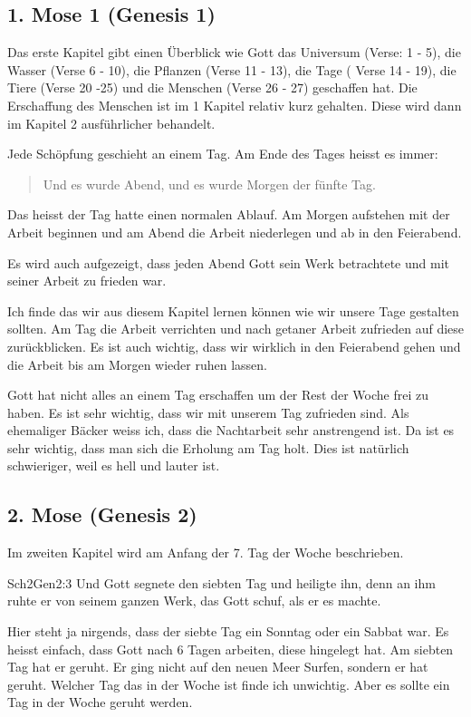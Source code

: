 
\subsection{1. Mose 1 (Genesis 1)}
Das erste Kapitel gibt einen Überblick wie Gott das Universum (Verse: 1 - 5), die Wasser (Verse 6 - 10), die Pflanzen (Verse 11 - 13), die Tage ( Verse 14 - 19), die Tiere (Verse 20 -25) und die Menschen (Verse 26 - 27) geschaffen hat. Die Erschaffung des Menschen ist im 1 Kapitel relativ kurz gehalten. Diese wird dann im Kapitel 2 ausführlicher behandelt.

Jede Schöpfung geschieht an einem Tag. Am Ende des Tages heisst es immer: \begin{quote}
    Und es wurde Abend, und es wurde Morgen der fünfte Tag.
\end{quote} Das heisst der Tag hatte einen normalen Ablauf. Am Morgen aufstehen mit der Arbeit beginnen und am Abend die Arbeit niederlegen und ab in den Feierabend.

Es wird auch aufgezeigt, dass jeden Abend Gott sein Werk betrachtete und mit seiner Arbeit zu frieden war.

Ich finde das wir aus diesem Kapitel lernen können wie wir unsere Tage gestalten sollten. Am Tag die Arbeit verrichten und nach getaner Arbeit zufrieden auf diese zurückblicken. Es ist auch wichtig, dass wir wirklich in den Feierabend gehen und die Arbeit bis am Morgen wieder ruhen lassen.

Gott hat nicht alles an einem Tag erschaffen um der Rest der Woche frei zu haben. Es ist sehr wichtig, dass wir mit unserem Tag zufrieden sind. Als ehemaliger Bäcker weiss ich, dass die Nachtarbeit sehr anstrengend ist. Da ist es sehr wichtig, dass man sich die Erholung am Tag holt. Dies ist natürlich schwieriger, weil es hell und lauter ist.
\subsection{2. Mose (Genesis 2)}
Im zweiten Kapitel wird am Anfang der 7. Tag der Woche beschrieben. 
\begin{bibeltext}{Sch2}{Gen}{2:3}
    Und Gott segnete den siebten Tag und heiligte ihn, denn an ihm ruhte er von seinem ganzen Werk, das Gott schuf, als er es machte.
\end{bibeltext}
Hier steht ja nirgends, dass der siebte Tag ein Sonntag oder ein Sabbat war. Es heisst einfach, dass Gott nach 6 Tagen arbeiten, diese hingelegt hat. Am siebten Tag hat er geruht. Er ging nicht auf den neuen Meer Surfen, sondern er hat geruht. Welcher Tag das in der Woche ist finde ich unwichtig. Aber es sollte ein Tag in der Woche geruht werden.

